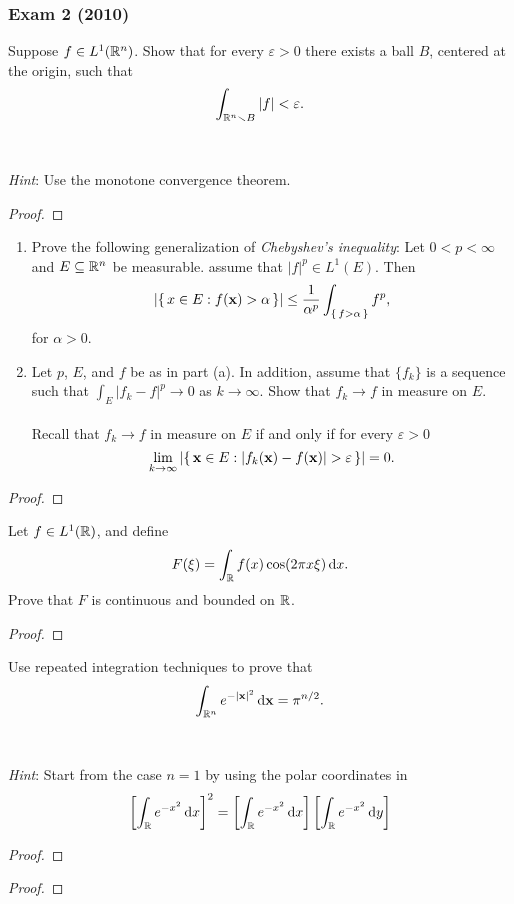 \subsubsection{Exam 2 (2010)}
\setcounter{exercise}{0}

\begin{problem}
Suppose $f\in L^1(\mathbb{R}^n)$. Show that for every $\varepsilon>0$ there
exists a ball $B$, centered at the origin, such that
\[
\int_{\mathbb{R}^n\smallsetminus B}|f|<\varepsilon.
\]
\\\\
\emph{Hint}: Use the monotone convergence theorem.
\end{problem}
\begin{proof}
\end{proof}
\begin{problem}
\begin{enumerate}[label=(\alph*),noitemsep]
\item Prove the following generalization of \emph{Chebyshev's inequality}:
  Let $0<p<\infty$ and $E\subseteq\mathbb{R}^n$ be measurable. assume that
  $|f|^p\in L^1(E)$. Then
\[
\left|\left\{\,x\in E:f(\mathbf{x})>\alpha\,\right\}\right|
\leq\frac{1}{\alpha^p}\int_{\left\{\,f>\alpha\,\right\}}f^p,
\]
for $\alpha>0$.
\item Let $p$, $E$, and $f$ be as in part (a). In addition, assume that
  $\{f_k\}$ is a sequence such that $\int_E|f_k-f|^p\to 0$ as
  $k\to\infty$. Show that $f_k\to f$ in measure on $E$.
\\\\
Recall that $f_k\to f$ in measure on $E$ if and only if for every
$\varepsilon>0$
\[
\lim_{k\to\infty}\left|\left\{\,\bfx\in
    E:|f_k(\bfx)-f(\bfx)|>\varepsilon\,\right\}\right|=0.
\]
\end{enumerate}
\end{problem}
\begin{proof}
\end{proof}

\begin{problem}
Let $f\in L^1(\mathbb{R})$, and define
\[
F(\xi)=\int_{\mathbb{R}} f(x)\cos(2\pi x\xi)\mathop{}\!\mathrm{d} x.
\]
Prove that $F$ is continuous and bounded on $\mathbb{R}$.
\end{problem}
\begin{proof}
\end{proof}

\begin{problem}
Use repeated integration techniques to prove that
\[
\int_{\mathbb{R}^n} e^{-|\mathbf{x}|^2}\mathop{}\!\mathrm{d}\mathbf{x}=\pi^{n/2}.
\]
\\\\
\emph{Hint}: Start from the case $n=1$ by using the polar coordinates in
\[
\left[\int_{\mathbb{R}} e^{-x^2}\mathop{}\!\mathrm{d} x\right]^2=
\left[\int_{\mathbb{R}} e^{-x^2}\mathop{}\!\mathrm{d} x\right]
\left[\int_{\mathbb{R}} e^{-x^2}\mathop{}\!\mathrm{d} y\right]
\]
\end{problem}
\begin{proof}
\end{proof}

\begin{problem}
\end{problem}
\begin{proof}
\end{proof}


